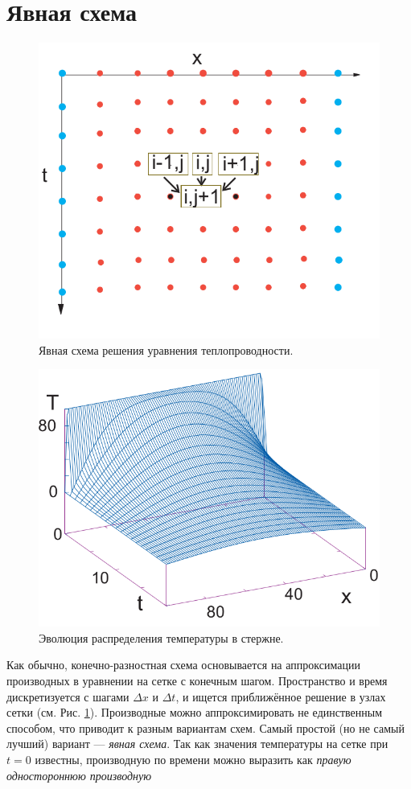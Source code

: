 \documentclass[12pt]{article}
\begin{document}
\section*{Явная схема}
\begin{figure}
\begin{center}
\includegraphics[width=0.6\linewidth]{./figs/01.png}
\caption{Явная схема решения уравнения теплопроводности.}
\label{fig:explicit}
\end{center}
\end{figure}
\begin{figure}
\begin{center}
\includegraphics[width=0.6\linewidth]{./figs/02.png}
\caption{Эволюция распределения температуры в стержне.}
\label{fig:solution}
\end{center}
\end{figure}
Как обычно, конечно-разностная схема основывается на аппроксимации производных в уравнении на сетке с конечным шагом. Пространство и время дискретизуется с шагами $\Delta x$ и $\Delta t$, и ищется приближённое решение в узлах сетки (см. Рис. \ref{fig:explicit}). Производные можно аппроксимировать не единственным способом, что приводит к разным вариантам схем. Самый простой (но не самый лучший) вариант --- \textit{явная схема}. Так как значения температуры на сетке при $t=0$ известны, производную по времени можно выразить как \textit{правую одностороннюю производную}
\end{document}
